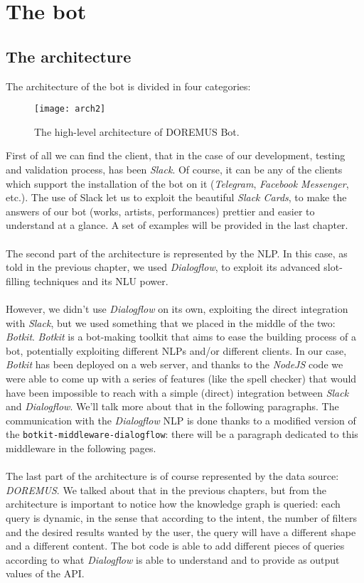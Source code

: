 \chapter{The bot}
	\section{The architecture}
	The architecture of the bot is divided in four categories:
	\begin{figure}[H]
		\centering
		\texttt{[image: arch2]}
		\caption{The high-level architecture of DOREMUS Bot.}
	\end{figure}
	First of all we can find the client, that in the case of our development, testing and validation process, has been \textit{Slack}. Of course, it can be any of the clients which support the installation of the bot on it (\textit{Telegram}, \textit{Facebook Messenger}, etc.). The use of Slack let us to exploit the beautiful \textit{Slack Cards}, to make the answers of our bot (works, artists, performances) prettier and easier to understand at a glance. A set of examples will be provided in the last chapter.\\\\
	The second part of the architecture is represented by the NLP. In this case, as told in the previous chapter, we used \textit{Dialogflow}, to exploit its advanced slot-filling techniques and its NLU power.\\\\
	However, we didn't use \textit{Dialogflow} on its own, exploiting the direct integration with \textit{Slack}, but we used something that we placed in the middle of the two: \textit{Botkit}. \textit{Botkit} is a bot-making toolkit that aims to ease the building process of a bot, potentially exploiting different NLPs and/or different clients. In our case, \textit{Botkit} has been deployed on a web server, and thanks to the \textit{NodeJS} code we were able to come up with a series of features (like the spell checker) that would have been impossible to reach with a simple (direct) integration between \textit{Slack} and \textit{Dialogflow}. We'll talk more about that in the following paragraphs. The communication with the \textit{Dialogflow} NLP is done thanks to a modified version of the \texttt{botkit-middleware-dialogflow}\cite{bmd}: there will be a paragraph dedicated to this middleware in the following pages.\\\\
	The last part of the architecture is of course represented by the data source: \textit{DOREMUS}. We talked about that in the previous chapters, but from the architecture is important to notice how the knowledge graph is queried: each query is dynamic, in the sense that according to the intent, the number of filters and the desired results wanted by the user, the query will have a different shape and a different content. The bot code is able to add different pieces of queries according to what \textit{Dialogflow} is able to understand and to provide as output values of the API.\\\\
